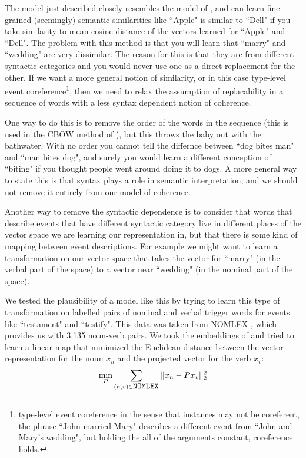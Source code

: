 \documentclass[11pt,letterpaper]{article}
\begin{document}
The model just described closely resembles the model of \cite{rami}, and
can learn fine grained (seemingly) semantic similarities like ``Apple" is
similar to ``Dell" if you take similarity to mean cosine distance of the
vectors learned for ``Apple" and ``Dell".
The problem with this method is that you will learn that ``marry" and
``wedding" are very dissimilar. The reason for this is that they are from
different syntactic categories and you would never use one as a direct replacement
for the other.
If we want a more general notion of similarity, or in this case type-level event
coreference\footnote{type-level event coreference in the sense that instances may
not be coreferent, the phrase ``John married Mary" describes a different event from
``John and Mary's wedding", but holding the all of the arguments constant, coreference holds.},
then we need to relax the assumption of replacability in a sequence of words with
a less syntax dependent notion of coherence.

One way to do this is to remove the order of the words in the sequence
(this is used in the CBOW method of \cite{DBLP:journals/corr/abs-1301-3781}),
but this throws the baby out with the bathwater. With no order you cannot
tell the differnce between ``dog bites man" and ``man bites dog", and surely
you would learn a different conception of ``biting" if you thought people went
around doing it to dogs.
A more general way to state this is that syntax plays a role in semantic interpretation,
and we should not remove it entirely from our model of coherence.

Another way to remove the syntactic dependence is to consider that words that describe events that have
different syntactic category live in different places of the vector space
we are learning our representation in, but that there is some kind of mapping
between event descriptions. For example we might want to learn a transformation
on our vector space that takes the vector for ``marry" (in the verbal part
of the space) to a vector near ``wedding" (in the nominal part of the space).

We tested the plausibility of a model like this by trying to learn this type
of transformation on labelled pairs of nominal and verbal trigger words for events
like ``testament" and ``testify". This data was taken from NOMLEX \cite{nomlex},
which provides us with 3,135 noun-verb pairs.
We took the embeddings of \cite{rami} and tried to learn a linear map that minimized
the Euclidean distance between the vector representation for the noun $x_n$ and the
projected vector for the verb $x_v$:
\[
	\min_P \sum_{(n,v) \in \mbox{\texttt{NOMLEX}}}
		|| x_n - P x_v ||_2^2
\]
\end{document}
